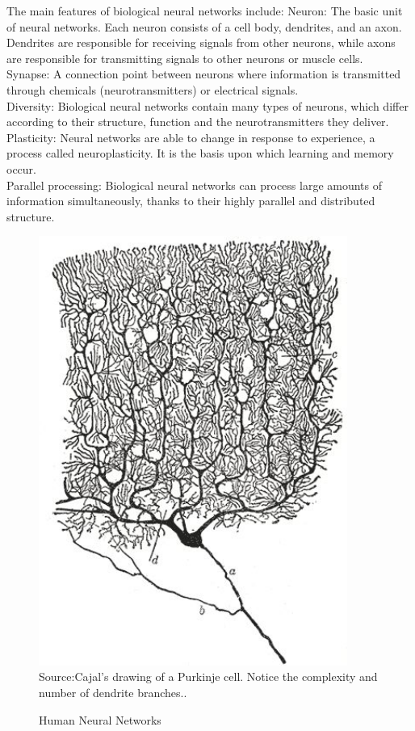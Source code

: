 \documentclass[paper=a4, fontsize=11pt]{scrartcl} %
\numberwithin{equation}{section} %
\numberwithin{figure}{section} %
\numberwithin{table}{section} %
\begin{document}
The main features of biological neural networks include:
Neuron: The basic unit of neural networks. Each neuron consists of a cell body, dendrites, and an axon. Dendrites are responsible for receiving signals from other neurons, while axons are responsible for transmitting signals to other neurons or muscle cells.
\\Synapse: A connection point between neurons where information is transmitted through chemicals (neurotransmitters) or electrical signals.
\\Diversity: Biological neural networks contain many types of neurons, which differ according to their structure, function and the neurotransmitters they deliver.
\\Plasticity: Neural networks are able to change in response to experience, a process called neuroplasticity. It is the basis upon which learning and memory occur.
\\Parallel processing: Biological neural networks can process large amounts of information simultaneously, thanks to their highly parallel and distributed structure.

\begin{figure}[H]
    \centering
    \caption{Human Neural Networks}
    \includegraphics[width=0.9\textwidth]{./data/neural-netwrok.jpg}
    \footnotesize{Source:Cajal’s drawing of a Purkinje cell. Notice the complexity and number of dendrite branches..}
    \label{fig:my_picture}
\end{figure}
\end{document}
